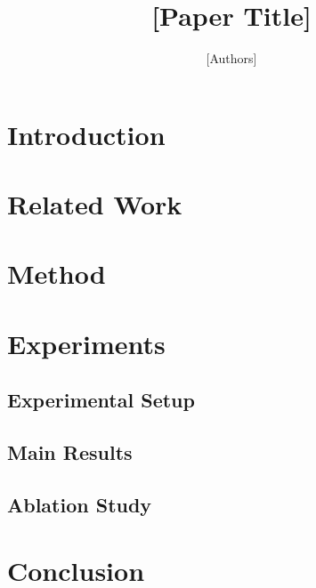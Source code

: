 \documentclass[10pt,letterpaper]{article}
\title{[Paper Title]}
\author{[Authors]}
\date{}
\begin{document}
\maketitle

\begin{abstract}
\end{abstract}

\section{Introduction}

\section{Related Work}

\section{Method}

\section{Experiments}

\subsection{Experimental Setup}

\subsection{Main Results}



\subsection{Ablation Study}

\section{Conclusion}



\end{document}
